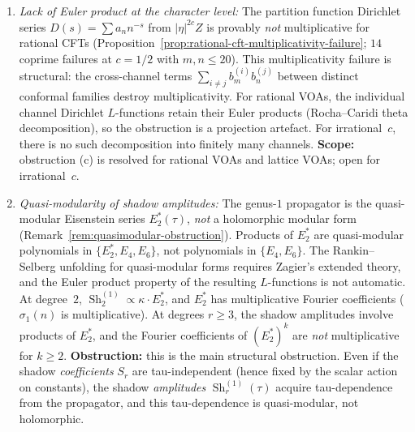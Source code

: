 \begin{theorem}
\begin{enumerate}[label=\textup{(\alph*)}]
\item \emph{Lack of Euler product at the character level:}
 The partition function Dirichlet series
 $D(s) = \sum a_n n^{-s}$ from $|\eta|^{2c}Z$ is provably
 \emph{not} multiplicative for rational CFTs
 \textup{(}Proposition~\textup{\ref{prop:rational-cft-multiplicativity-failure}};
 $14$ coprime failures at $c = 1/2$ with $m,n \le 20$\textup{)}.
 This multiplicativity failure is structural: the cross-channel
 terms $\sum_{i \neq j} b_m^{(i)} b_n^{(j)}$ between distinct
 conformal families destroy multiplicativity. For rational VOAs,
 the individual channel Dirichlet $L$-functions retain their
 Euler products \textup{(}Rocha--Caridi theta decomposition\textup{)},
 so the obstruction is a projection artefact. For irrational~$c$,
 there is no such decomposition into finitely many channels.
 \textbf{Scope:} obstruction (c) is resolved for rational
 VOAs and lattice VOAs; open for irrational~$c$.

\item \emph{Quasi-modularity of shadow amplitudes:}
 The genus-$1$ propagator is the quasi-modular Eisenstein
 series $E_2^*(\tau)$, \emph{not} a holomorphic modular form
 \textup{(}Remark~\textup{\ref{rem:quasimodular-obstruction}}\textup{)}.
 Products of $E_2^*$ are quasi-modular polynomials in
 $\{E_2^*, E_4, E_6\}$, not polynomials in $\{E_4, E_6\}$.
 The Rankin--Selberg unfolding for quasi-modular forms requires
 Zagier's extended theory, and the Euler product property of the
 resulting $L$-functions is not automatic.
 At degree~$2$, $\operatorname{Sh}_2^{(1)} \propto \kappa \cdot E_2^*$,
 and $E_2^*$ has multiplicative Fourier coefficients
 \textup{(}$\sigma_1(n)$ is multiplicative\textup{)}.
 At degrees $r \ge 3$, the shadow amplitudes involve products
 of $E_2^*$, and the Fourier coefficients of $(E_2^*)^k$ are
 \emph{not} multiplicative for $k \ge 2$.
 \textbf{Obstruction:} this is the main structural obstruction.
 Even if the shadow \emph{coefficients} $S_r$ are tau-independent
 \textup{(}hence fixed by the scalar action on constants\textup{)}, the
 shadow \emph{amplitudes} $\operatorname{Sh}_r^{(1)}(\tau)$
 acquire tau-dependence from the propagator, and this
 tau-dependence is quasi-modular, not holomorphic.


\end{enumerate}
\end{theorem}
